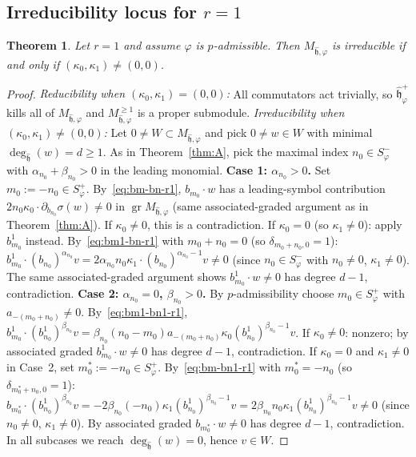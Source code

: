 \documentclass{amsart}
\DeclareMathOperator{\gr}{gr}
\newcommand{\h}{\mathfrak{h}}
\newcommand{\wh}[1]{\widehat{#1}}
\newcommand{\whh}{\wh{\h}}
\newtheorem{theorem}{Theorem}[section]
\theoremstyle{definition}
\theoremstyle{remark}
\numberwithin{equation}{section}
\begin{document}
\subsection{Irreducibility locus for $r=1$}
\begin{theorem}\label{thm:A-prime}
Let $r=1$ and assume $\varphi$ is $p$-admissible.  Then
$M_{\whh,\varphi}$ is irreducible if and only if
$(\kappa_0,\kappa_1)\neq(0,0)$.
\end{theorem}
\begin{proof}
\emph{Reducibility when $(\kappa_0,\kappa_1)=(0,0)$:}
All commutators act trivially, so $\whh_\varphi^+$ kills all of
$M_{\whh,\varphi}$ and $M_{\whh,\varphi}^{\ge1}$ is a proper submodule.
\emph{Irreducibility when $(\kappa_0,\kappa_1)\neq(0,0)$:}
Let $0\neq W\subset M_{\whh,\varphi}$ and pick $0\neq w\in W$ with
minimal $\deg_{\whh}(w)=d\ge1$.
As in Theorem~\ref{thm:A}, pick the maximal index $n_0\in S_\varphi^-$
with $\alpha_{n_0}+\beta_{n_0}>0$ in the leading monomial.
\textbf{Case 1: $\alpha_{n_0}>0$.}  Set $m_0:=-n_0\in S_\varphi^+$.
By~\eqref{eq:bm-bn-r1}, $b_{m_0}\cdot w$ has a leading-symbol contribution
$2n_0\kappa_0\cdot\partial_{b_{n_0}}\sigma(w)\neq0$ in
$\gr M_{\whh,\varphi}$ (same associated-graded argument as in
Theorem~\ref{thm:A}).  If $\kappa_0\neq0$, this is a contradiction.
If $\kappa_0=0$ (so $\kappa_1\neq0$): apply $b_{m_0}^1$ instead.
By~\eqref{eq:bm1-bn-r1} with $m_0+n_0=0$ (so $\delta_{m_0+n_0,0}=1$):
$b_{m_0}^1\cdot(b_{n_0})^{\alpha_{n_0}}v
=2\alpha_{n_0}n_0\kappa_1\cdot(b_{n_0})^{\alpha_{n_0}-1}v\neq0$
(since $n_0\in S_\varphi^-$ with $n_0\neq0$, $\kappa_1\neq0$).
The same associated-graded argument shows $b_{m_0}^1\cdot w\neq0$
has degree $d-1$, contradiction.
\textbf{Case 2: $\alpha_{n_0}=0$, $\beta_{n_0}>0$.}  By
$p$-admissibility choose $m_0\in S_\varphi^+$ with $a_{-(m_0+n_0)}\neq0$.
By~\eqref{eq:bm1-bn1-r1}, $b_{m_0}^1\cdot(b_{n_0}^1)^{\beta_{n_0}}v
=\beta_{n_0}(n_0-m_0)a_{-(m_0+n_0)}\kappa_0(b_{n_0}^1)^{\beta_{n_0}-1}v$.
If $\kappa_0\neq0$: nonzero; by associated graded $b_{m_0}^1\cdot w\neq0$
has degree $d-1$, contradiction.
If $\kappa_0=0$ and $\kappa_1\neq0$ in Case~2, set $m_0^*:=-n_0\in S_\varphi^+$.
By~\eqref{eq:bm-bn1-r1} with $m_0^*=-n_0$ (so $\delta_{m_0^*+n_0,0}=1$):
$b_{m_0^*}\cdot(b_{n_0}^1)^{\beta_{n_0}}v
=-2\beta_{n_0}(-n_0)\kappa_1(b_{n_0}^1)^{\beta_{n_0}-1}v
=2\beta_{n_0}n_0\kappa_1(b_{n_0}^1)^{\beta_{n_0}-1}v\neq0$
(since $n_0\neq0$, $\kappa_1\neq0$).
By associated graded $b_{m_0^*}\cdot w\neq0$ has degree $d-1$, contradiction.
In all subcases we reach $\deg_{\whh}(w)=0$, hence $v\in W$.
\end{proof}
\end{document}
